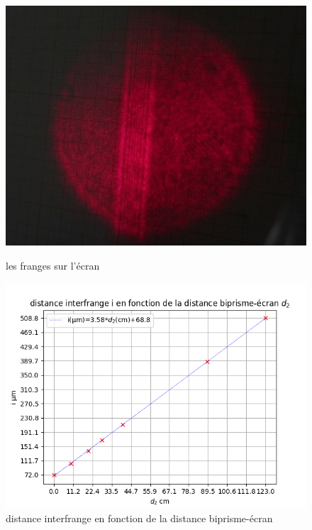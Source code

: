 \documentclass[11pt, a4paper]{article}
\begin{document}
\begin{figure}[htbp]
    \centering
    \begin{minipage}[t]{0.48\textwidth}
        \centering
        \includegraphics[width=\textwidth]{images/photo}
        \caption{les franges sur l'écran}
        \label{photo}
    \end{minipage}
    \hfill
    \begin{minipage}[t]{0.48\textwidth}
        \centering
        \includegraphics[width=\textwidth]{images/2.1}
        \caption{distance interfrange en fonction de la distance biprisme-écran}
        \label{courbe1}
    \end{minipage}
\end{figure}
\end{document}
